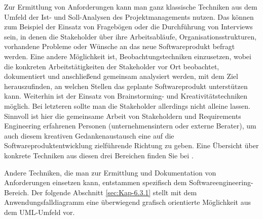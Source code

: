 Zur Ermittlung von Anforderungen kann man ganz klassische Techniken aus dem Umfeld der Ist- und Soll-Analysen des Projektmanagements nutzen. Das können zum Beispiel der Einsatz von Fragebögen oder die Durchführung von Interviews sein, in denen die Stake\-holder über ihre Arbeitsabläufe, Organisationsstrukturen, vorhandene Probleme oder Wünsche an das neue Softwareprodukt befragt werden. Eine andere Möglichkeit ist, Beobachtungstechniken einzusetzen, wobei die konkreten Arbeitstätigkeiten der Stake\-holder vor Ort beobachtet, dokumentiert und anschließend gemeinsam analysiert werden, mit dem Ziel herauszufinden, an welchen Stellen das geplante Softwareprodukt unterstützen kann. Weiterhin ist der Einsatz von Brainstorming- und Kreativitätstechniken möglich. Bei letzteren sollte man die Stake\-holder allerdings nicht alleine lassen. Sinnvoll ist hier die gemein\-same Arbeit von Stake\-holdern und Requirements Engineering erfahrenen Personen (unternehmens\-intern oder externe Berater), um auch diesem kreativen Gedankenaustausch eine auf die Softwareproduktentwicklung zielführende Richtung zu geben. Eine Übersicht über konkrete Techniken aus diesen drei Bereichen finden Sie bei \cite[26-33]{poh15}.

\pagebreak %

Andere Techniken, die man zur Ermittlung und Dokumentation von Anforderungen einsetzen kann, entstammen spezifisch dem Softwareengineering-Bereich. Der folgende Abschnitt \ref{sec:Kap-6.3.1} stellt mit dem Anwendungsfalldiagramm eine überwiegend grafisch orientierte Möglichkeit aus dem UML-Umfeld vor.
